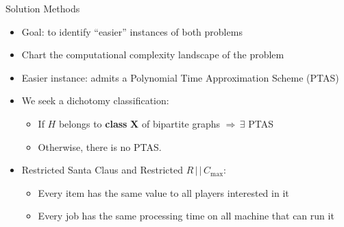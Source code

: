 \begin{frame}[t]{Solution Methods}
    \begin{itemize}
        \item<1-> Goal: to identify ``easier'' instances of both problems
        \item<2-> Chart the computational complexity landscape of the  problem
        \item<3-> Easier instance: admits a Polynomial Time Approximation Scheme (PTAS)
        \item<4-> We seek a dichotomy classification: 
            \begin{itemize}
                \item<5->If $H$ belongs to \textbf{class} $\mathbf{X}$ of bipartite graphs $\Rightarrow \, \exists$ PTAS
                \item<6-> Otherwise, there is no PTAS.
            \end{itemize}
        \item<7-> Restricted Santa Claus and Restricted $R \, | \, | \, C_{\max}$:
            \begin{itemize}
                \item<8-> Every item has the same value to all players interested in it
                \item<9-> Every job has the same processing time on all machine that can run it
            \end{itemize}
    \end{itemize}
\end{frame}

